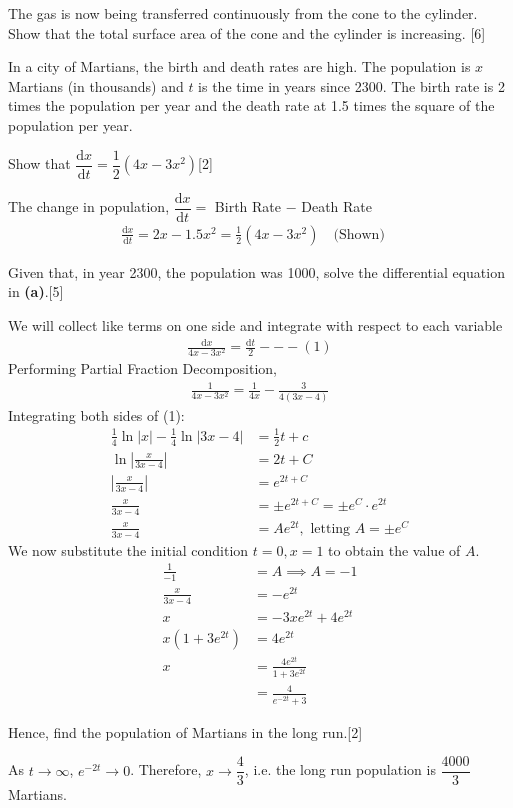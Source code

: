 \documentclass[12pt, a4 paper]{article}
\begin{document}
\begin{outline}[enumerate]
 \2 The gas is now being transferred continuously from the cone to the cylinder. Show that the total surface area of the cone and the cylinder is increasing. \hfill[6]

 \1 In a city of Martians, the birth and death rates are high. The population is $x$ Martians (in thousands) and $t$ is the time in years since 2300. The birth rate is 2 times the population per year and the death rate at 1.5 times the square of the population per year. %

 \2 Show that $\dfrac{{{\textrm{d}}x}}{{{\textrm{d}}t}} = \dfrac{1}{2}(4x - 3{x^2})$\hfill[2]
 \begin{answer}
   The change in population, $\dfrac{{{\textrm{d}}x}}{{{\textrm{d}}t}} =$ Birth Rate $-$ Death Rate
   \begin{align*}
     \frac{{{\textrm{d}}x}}{{{\textrm{d}}t}} = 2x-1.5x^2 =\frac{1}{2}(4x - 3{x^2}) \quad\textrm{(Shown)}\quad
   \end{align*}
 \end{answer}
 \2 Given that, in year 2300, the population was 1000, solve the differential equation in \textbf{(a)}.\hfill[5]
 \begin{answer}
   We will collect like terms on one side and integrate with respect to each variable
   \begin{align*}
     \frac{\mathrm{d}x}{4x-3x^2} = \frac{\mathrm{d}t}{2} ---(1)
   \end{align*}
   Performing Partial Fraction Decomposition,
   \begin{align*}
     \frac{1}{4x-3x^2} = \frac{1}{4x} - \frac{3}{4(3x-4)}
   \end{align*}
   Integrating both sides of (1):
   \begin{align*}
     \frac{1}{4}\ln{|x|} - \frac{1}{4}\ln{|3x-4|}  &= \frac{1}{2}t + c \\
     \ln{\left|\frac{x}{3x-4}\right|} &= 2t + C \\
     \left|\frac{x}{3x-4}\right| &= e^{2t+C} \\
     \frac{x}{3x-4} &= \pm e^{2t+C} = \pm e^{C} \cdot e^{2t} \\
     \frac{x}{3x-4} &= Ae^{2t},\textrm{ letting $A=\pm e^{C}$}
   \end{align*}
   We now substitute the initial condition $t=0,x=1$ to obtain the value of $A$.
   \begin{align*}
     \frac{1}{-1} &= A \implies A=-1\\
     \frac{x}{3x-4} &= -e^{2t} \\
     x &= -3xe^{2t}+4e^{2t} \\
     x(1+3e^{2t}) &= 4e^{2t}\\
     x &= \frac{4e^{2t}}{1+3e^{2t}} \\
     &= \frac{4}{e^{-2t}+3}
   \end{align*}
 \end{answer}
 \2 Hence, find the population of Martians in the long run.\hfill[2]
 \begin{answer}
 As $t \rightarrow \infty$, $e^{-2t} \rightarrow 0$. Therefore, $x \rightarrow \dfrac{4}{3}$, i.e. the long run population is $\dfrac{4000}{3}$ Martians.
\end{answer}

\end{outline}
\end{document}
